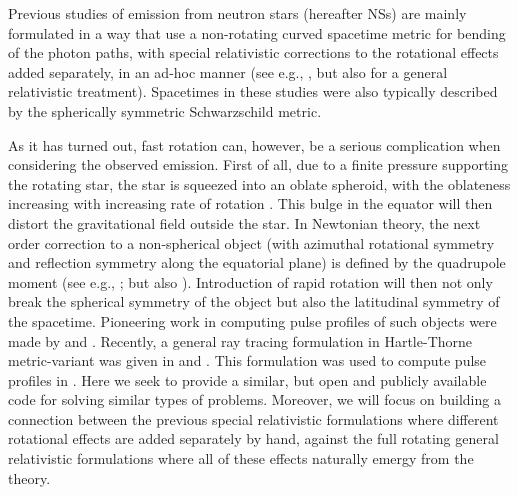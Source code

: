\documentclass{aa}
\newcommand{\sch}{Schwarzschild }
\begin{document}
Previous studies of emission from neutron stars (hereafter NSs) are mainly formulated in a way that use a non-rotating curved spacetime metric for bending of the photon paths, with special relativistic corrections to the rotational effects added separately, in an ad-hoc manner (see e.g., \citealt{PFC83, P95, WM01, PG03, PB06}, but also \citealt{BR01} for a general relativistic treatment).  %
Spacetimes in these studies were also typically described by the spherically symmetric \sch metric.

As it has turned out, fast rotation can, however, be a serious complication when considering the observed emission.
First of all, due to a finite pressure supporting the rotating star, the star is squeezed into an oblate spheroid, with the oblateness increasing with increasing rate of rotation \citep{CST94, MLC07, BBP13, aGM14}.
This bulge in the equator will then distort the gravitational field outside the star.
In Newtonian theory, the next order correction to a non-spherical object (with azimuthal rotational symmetry and reflection symmetry along the equatorial plane) is defined by the quadrupole moment (see e.g., \citealt{LP99}; but also \citealt{PA12}).
Introduction of rapid rotation will then not only break the spherical symmetry of the object but also the latitudinal symmetry of the spacetime.
Pioneering work in computing pulse profiles of such objects were made by \citet{CL05} and \citet{CML07}.
Recently, a general ray tracing formulation in Hartle-Thorne metric-variant was given in \citet{PJ12} and \citet{BPO12}. 
This formulation was used to compute pulse profiles in \citet{PO14}.
Here we seek to provide a similar, but open and publicly available code for solving similar types of problems.
Moreover, we will focus on building a connection between the previous special relativistic formulations where different rotational effects are added separately by hand, against the full rotating general relativistic formulations where all of these effects naturally emergy from the theory.
\end{document}
